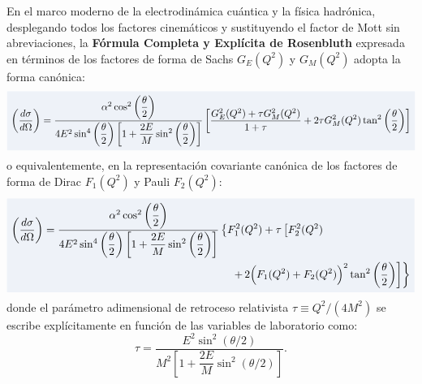 \documentclass[10pt,a4paper]{article}
\newcommand{\dest}[1]{{\setlength{\fboxsep}{4pt}\colorbox{colordest}{$\displaystyle #1$}}}
\begin{document}
En el marco moderno de la electrodinámica cuántica y la física hadrónica, desplegando todos los factores cinemáticos y sustituyendo el factor de Mott sin abreviaciones, la \textbf{Fórmula Completa y Explícita de Rosenbluth} expresada en términos de los factores de forma de Sachs $G_E(Q^2)$ y $G_M(Q^2)$ adopta la forma canónica:
\begin{equation}
\dest{
\left(\frac{d\sigma}{d\Omega}\right) = \frac{\alpha^2 \cos^2\left(\dfrac{\theta}{2}\right)}{4 E^2 \sin^4\left(\dfrac{\theta}{2}\right) \left[ 1 + \dfrac{2E}{M}\sin^2\left(\dfrac{\theta}{2}\right) \right]} \left[ \frac{G_E^2(Q^2) + \tau G_M^2(Q^2)}{1+\tau} + 2\tau G_M^2(Q^2) \tan^2\left(\frac{\theta}{2}\right) \right]
}
\label{eq:rosenbluth_master_intro}
\end{equation}
o equivalentemente, en la representación covariante canónica de los factores de forma de Dirac $F_1(Q^2)$ y Pauli $F_2(Q^2)$:
\begin{equation}
\dest{
\begin{aligned}
\left(\frac{d\sigma}{d\Omega}\right) = \frac{\alpha^2 \cos^2\left(\dfrac{\theta}{2}\right)}{4 E^2 \sin^4\left(\dfrac{\theta}{2}\right) \left[ 1 + \dfrac{2E}{M}\sin^2\left(\dfrac{\theta}{2}\right) \right]} &\left\{ F_1^2(Q^2) + \tau \left[ F_2^2(Q^2) \right.\right. \\
&\quad \left.\left. +\, 2\Big( F_1(Q^2) + F_2(Q^2) \Big)^2 \tan^2\left(\frac{\theta}{2}\right) \right] \right\}
\end{aligned}
}
\label{eq:rosenbluth_dirac_pauli_intro}
\end{equation}
donde el parámetro adimensional de retroceso relativista $\tau \equiv Q^2/(4M^2)$ se escribe explícitamente en función de las variables de laboratorio como:
\begin{equation}
\tau = \frac{E^2 \sin^2(\theta/2)}{M^2 \left[1 + \dfrac{2E}{M}\sin^2(\theta/2)\right]}.
\label{eq:tau_explicit_intro}
\end{equation}
\end{document}

